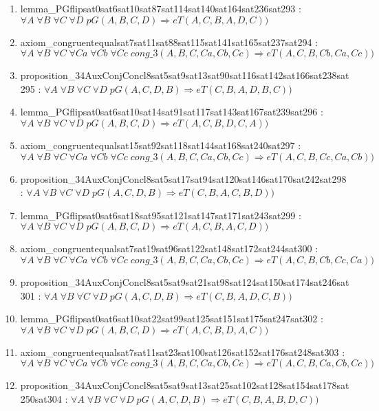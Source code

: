 \documentclass{article}
\begin{document}
\begin{enumerate}
\item lemma\_PGflipsat0sat6sat10sat87sat114sat140sat164sat236sat293 : $\forall A\;\forall B\;\forall C\;\forall D\;pG(A, B, C, D) \Rightarrow eT(A, C, B, A, D, C))$
\item axiom\_congruentequalsat7sat11sat88sat115sat141sat165sat237sat294 : $\forall A\;\forall B\;\forall C\;\forall Ca\;\forall Cb\;\forall Cc\;cong\_3(A, B, C, Ca, Cb, Cc) \Rightarrow eT(A, C, B, Cb, Ca, Cc))$
\item proposition\_34AuxConjConcl8sat5sat9sat13sat90sat116sat142sat166sat238sat295 : $\forall A\;\forall B\;\forall C\;\forall D\;pG(A, C, D, B) \Rightarrow eT(C, B, A, D, B, C))$
\item lemma\_PGflipsat0sat6sat10sat14sat91sat117sat143sat167sat239sat296 : $\forall A\;\forall B\;\forall C\;\forall D\;pG(A, B, C, D) \Rightarrow eT(A, C, B, D, C, A))$
\item axiom\_congruentequalsat15sat92sat118sat144sat168sat240sat297 : $\forall A\;\forall B\;\forall C\;\forall Ca\;\forall Cb\;\forall Cc\;cong\_3(A, B, C, Ca, Cb, Cc) \Rightarrow eT(A, C, B, Cc, Ca, Cb))$
\item proposition\_34AuxConjConcl8sat5sat17sat94sat120sat146sat170sat242sat298 : $\forall A\;\forall B\;\forall C\;\forall D\;pG(A, C, D, B) \Rightarrow eT(C, B, A, C, B, D))$
\item lemma\_PGflipsat0sat6sat18sat95sat121sat147sat171sat243sat299 : $\forall A\;\forall B\;\forall C\;\forall D\;pG(A, B, C, D) \Rightarrow eT(A, C, B, A, C, D))$
\item axiom\_congruentequalsat7sat19sat96sat122sat148sat172sat244sat300 : $\forall A\;\forall B\;\forall C\;\forall Ca\;\forall Cb\;\forall Cc\;cong\_3(A, B, C, Ca, Cb, Cc) \Rightarrow eT(A, C, B, Cb, Cc, Ca))$
\item proposition\_34AuxConjConcl8sat5sat9sat21sat98sat124sat150sat174sat246sat301 : $\forall A\;\forall B\;\forall C\;\forall D\;pG(A, C, D, B) \Rightarrow eT(C, B, A, D, C, B))$
\item lemma\_PGflipsat0sat6sat10sat22sat99sat125sat151sat175sat247sat302 : $\forall A\;\forall B\;\forall C\;\forall D\;pG(A, B, C, D) \Rightarrow eT(A, C, B, D, A, C))$
\item axiom\_congruentequalsat7sat11sat23sat100sat126sat152sat176sat248sat303 : $\forall A\;\forall B\;\forall C\;\forall Ca\;\forall Cb\;\forall Cc\;cong\_3(A, B, C, Ca, Cb, Cc) \Rightarrow eT(A, C, B, Ca, Cb, Cc))$
\item proposition\_34AuxConjConcl8sat5sat9sat13sat25sat102sat128sat154sat178sat250sat304 : $\forall A\;\forall B\;\forall C\;\forall D\;pG(A, C, D, B) \Rightarrow eT(C, B, A, B, D, C))$

\end{enumerate}
\end{document}
